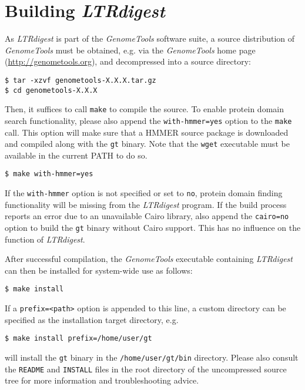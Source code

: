 \documentclass[12pt,titlepage]{article}
\newcommand{\LTRdigest}{\textit{LTRdigest}\xspace}
\newcommand{\GenomeTools}{\textit{GenomeTools}\xspace}
\newcommand{\Gt}{\texttt{gt}\xspace}
\begin{document}
\section{Building \emph{LTRdigest}} \label{Building}

As \LTRdigest is part of the \GenomeTools software suite, a source distribution of \GenomeTools must be obtained, e.g. via the \GenomeTools home page (\url{http://genometools.org}), and decompressed into a source directory:

\begin{verbatim}
$ tar -xzvf genometools-X.X.X.tar.gz
$ cd genometools-X.X.X
\end{verbatim}

Then, it suffices to call \texttt{make} to compile the source. To enable protein domain search functionality, please also append the \texttt{with-hmmer=yes} option to the \texttt{make} call. This option will make sure that a HMMER source package is downloaded and compiled along with the \Gt binary. Note that the \texttt{wget} executable must be available in the current PATH to do so.

\begin{verbatim}
$ make with-hmmer=yes
\end{verbatim}

If the \texttt{with-hmmer} option is not specified or set to \texttt{no}, protein domain finding functionality will be missing from the \LTRdigest program. If the build process reports an error due to an unavailable Cairo library, also append the \texttt{cairo=no} option to build the \Gt binary without Cairo support. This has no influence on the function of \LTRdigest .

After successful compilation, the \GenomeTools executable containing \LTRdigest can then be installed for system-wide use as follows:

\begin{verbatim}
$ make install
\end{verbatim}

If a \texttt{prefix=<path>} option is appended to this line, a custom directory can be specified as the installation target directory, e.g.

\begin{verbatim}
$ make install prefix=/home/user/gt
\end{verbatim}

will install the \Gt binary in the \texttt{/home/user/gt/bin} directory.
Please also consult the \texttt{README} and \texttt{INSTALL} files in the root directory of the uncompressed source tree for more information and troubleshooting advice.
\end{document}
